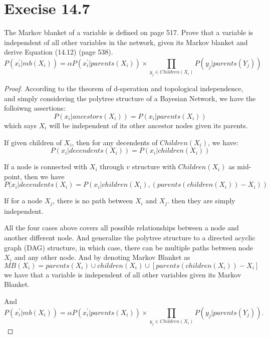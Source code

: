 \documentclass{article}
\begin{document}
\section{Execise 14.7}
The Markov blanket of a variable is defined on page 517. Prove that a
variable is independent of all other variables in the network, given
its Markov blanket and derive Equation (14.12) (page 538).
\[ P(x_i^{\prime}|mb(X_i))=\alpha P(x_i^{\prime}|parents(X_i))\times
\prod_{y_j\in Children(X_i)}P(y_j|parents(Y_j)) \]
\begin{proof}
  According to the theorem of d-speration and topological
  independence, and simply considering the polytree structure of a
  Bayesian Network, we have the folloiwng assertions: \\
  \[ P(x_i|ancestors(X_i)) = P(x_i|parents(X_i)) \] which says $X_i$
  will be independent of its other ancestor nodes given its parents. 

  If given children of $X_i$, then for any decendents of
  $Children(X_i)$, we have:
  \[ P(x_i|decendents(X_i)) = P(x_i|children(X_i)) \] 
  
  If a node is connected with $X_i$ through $v$ structure with
  $Children(X_i)$ as mid-point, then we have 
  \[ P(x_i|decendents(X_i) =
  P(x_i|children(X_i),(parents(children(X_i))-X_i)) \]

  If for a node $X_j$, there is no path between $X_i$ and $X_j$. then
  they are simply independent. 

  All the four cases above covers all possible relationships between a
  node and another different node. And generalize the polytree
  structure to a directed acyclic graph (DAG) structure, in which
  case, there can be multiple paths between node $X_i$ and any other
  node. And by denoting Markov Blanket as 
  \[ MB(X_i)=parents(X_i)\cup children(X_i) \cup [parents(children(X_i))-X_i] \]
  we have that a variable is independent of all other variables given
  its Markov Blanket. 

  And \[P(x_i^{\prime}|mb(X_i))=\alpha P(x_i^{\prime}|parents(X_i))\times
  \prod_{y_j\in Children(X_i)}P(y_j|parents(Y_j)). \] 
\end{proof}
\end{document}
